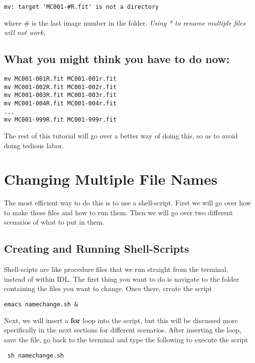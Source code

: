 \documentclass[10pt,preprint]{article}
\begin{document}
\begin{verbatim}
mv: target 'MC001-#R.fit' is not a directory
\end{verbatim}

where \#{} is the last image number in the folder.  \emph{Using * to rename multiple files will not work}.  

\subsection{What you might think you have to do now:}

\begin{verbatim}
mv MC001-001R.fit MC001-001r.fit
mv MC001-002R.fit MC001-002r.fit
mv MC001-003R.fit MC001-003r.fit
mv MC001-004R.fit MC001-004r.fit
...
mv MC001-999R.fit MC001-999r.fit
\end{verbatim}

The rest of this tutorial will go over a better way of doing this, so as to avoid doing tedious labor.

\section{Changing Multiple File Names}

The most efficient way to do this is to use a shell-script.  First we will go over how to make these files and how to run them.  Then we will go over two different scenarios of what to put in them.

\subsection{Creating and Running Shell-Scripts}
Shell-scipts are like procedure files that we run straight from the terminal, instead of within IDL.  The first thing you want to do is navigate to the folder containing the files you want to change.  Once there, create the script

\begin{verbatim}
emacs namechange.sh &
\end{verbatim}

Next, we will insert a \textbf{for} loop into the script, but this will be discussed more specifically in the next sections for different scenarios.  After inserting the loop, save the file, go back to the terminal and type the following to execute the script

\begin{verbatim}
 sh namechange.sh
\end{verbatim}
\end{document}
